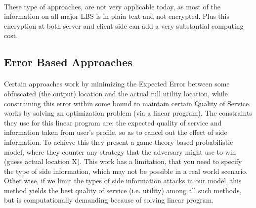 \documentclass[12pt]{report}
\theoremstyle{named}
\begin{document}
\paragraph{}
These type of approaches, are not very applicable today, as most of the information on all major LBS is in plain text and not encrypted. Plus this encryption at both server and client side can add a very substantial computing cost.



\subsection{Error Based Approaches}
\paragraph{}
Certain approaches work by minimizing the Expected Error between some obfuscated (the output) location and the actual full utility location, while constraining this error within some bound to maintain certain Quality of Service. \cite{shokri2012protecting} works by solving an optimization problem (via a linear program). The constraints they use for this linear program are: the expected quality of service and information taken from user's profile, so as to cancel out the effect of side information. To achieve this they present a game-theory based probabilistic model, where they counter any strategy that the adversary might use to win (guess actual location X). This work has a limitation, that you need to specify the type of side information, which may not be possible in a real world scenario. Other wise, if we limit the types of side information attacks in our model, this method yields the best quality of service (i.e. utility) among all such methods, but is computationally demanding because of solving linear program.
\end{document}
